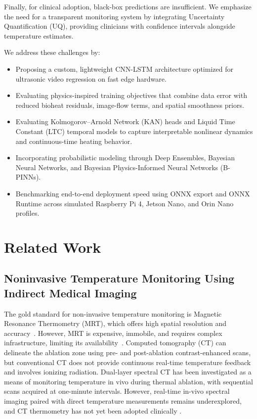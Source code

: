 \documentclass[conference]{IEEEtran}
\begin{document}
Finally, for clinical adoption, black-box predictions are insufficient. We emphasize the need for a transparent monitoring system by integrating Uncertainty Quantification (UQ), providing clinicians with confidence intervals alongside temperature estimates.

We address these challenges by:
\begin{itemize}
    \item Proposing a custom, lightweight CNN-LSTM architecture optimized for ultrasonic video regression on fast edge hardware.
    \item Evaluating physics-inspired training objectives that combine data error with reduced bioheat residuals, image-flow terms, and spatial smoothness priors.
    \item Evaluating Kolmogorov--Arnold Network (KAN) heads and Liquid Time Constant (LTC) temporal models to capture interpretable nonlinear dynamics and continuous-time heating behavior.
    \item Incorporating probabilistic modeling through Deep Ensembles, Bayesian Neural Networks, and Bayesian Physics-Informed Neural Networks (B-PINNs).
    \item Benchmarking end-to-end deployment speed using ONNX export and ONNX Runtime across simulated Raspberry Pi 4, Jetson Nano, and Orin Nano profiles.
\end{itemize}

\section{Related Work}

 \subsection{Noninvasive Temperature Monitoring Using Indirect Medical Imaging}

The gold standard for non-invasive temperature monitoring is Magnetic Resonance Thermometry (MRT), which offers high spatial resolution and accuracy~\cite{chenProstateCancerMR2000,baronVivoT2Based2014, bertschNoninvasiveTemperatureMapping1998, kozakUsingDiffusionMRI2010,riekeMRThermometry2008}. 
However, MRT is expensive, immobile, and requires complex infrastructure, limiting its availability~\cite{Geoghegan2022}.
Computed tomography (CT) can delineate the ablation zone using pre- and post-ablation contrast-enhanced scans, but conventional CT does not provide continuous real-time temperature feedback and involves ionizing radiation.
Dual-layer spectral CT has been investigated as a means of monitoring temperature in vivo during thermal ablation, with sequential scans acquired at one-minute intervals. \cite{varbleDualLayerSpectralCT2026}
However, real-time in-vivo spectral imaging paired with direct temperature measurements remains underexplored, and CT thermometry has not yet been adopted clinically \cite{bydderTemperatureDependenceComputed1979, faniCTbasedThermometryOverview2014, liuReproducibleSpectralCT2024}.
  
\end{document}
